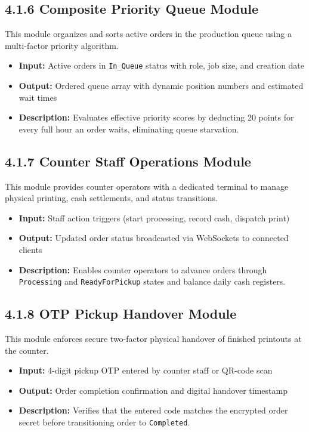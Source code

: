 \documentclass[12pt,a4paper]{report}
\begin{document}
\subsection{4.1.6 Composite Priority Queue Module}
This module organizes and sorts active orders in the production queue using a multi-factor priority algorithm.
\begin{itemize}[leftmargin=0.35in, itemsep=1pt]
  \item \textbf{Input:} Active orders in \texttt{In\_Queue} status with role, job size, and creation date
  \item \textbf{Output:} Ordered queue array with dynamic position numbers and estimated wait times
  \item \textbf{Description:} Evaluates effective priority scores by deducting 20 points for every full hour an order waits, eliminating queue starvation.
\end{itemize}

\subsection{4.1.7 Counter Staff Operations Module}
This module provides counter operators with a dedicated terminal to manage physical printing, cash settlements, and status transitions.
\begin{itemize}[leftmargin=0.35in, itemsep=1pt]
  \item \textbf{Input:} Staff action triggers (start processing, record cash, dispatch print)
  \item \textbf{Output:} Updated order status broadcasted via WebSockets to connected clients
  \item \textbf{Description:} Enables counter operators to advance orders through \texttt{Processing} and \texttt{ReadyForPickup} states and balance daily cash registers.
\end{itemize}

\subsection{4.1.8 OTP Pickup Handover Module}
This module enforces secure two-factor physical handover of finished printouts at the counter.
\begin{itemize}[leftmargin=0.35in, itemsep=1pt]
  \item \textbf{Input:} 4-digit pickup OTP entered by counter staff or QR-code scan
  \item \textbf{Output:} Order completion confirmation and digital handover timestamp
  \item \textbf{Description:} Verifies that the entered code matches the encrypted order secret before transitioning order to \texttt{Completed}.
\end{itemize}
\end{document}
